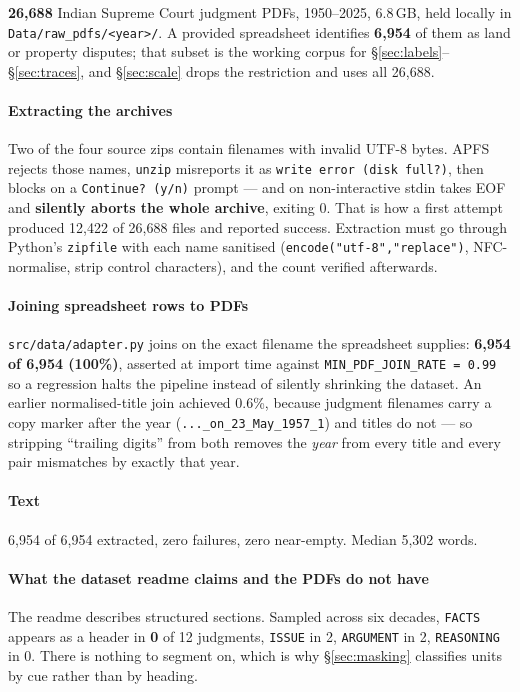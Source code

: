 \documentclass[12pt,a4paper]{article}
\newcommand{\code}[1]{\texttt{\small #1}}
\begin{document}
\textbf{26,688} Indian Supreme Court judgment PDFs, 1950--2025, 6.8\,GB, held locally in
\code{Data/raw\_pdfs/<year>/}. A provided spreadsheet identifies \textbf{6,954} of them as land or
property disputes; that subset is the working corpus for §\ref{sec:labels}--§\ref{sec:traces}, and
§\ref{sec:scale} drops the restriction and uses all 26,688.

\paragraph{Extracting the archives} Two of the four source zips contain filenames with invalid
UTF-8 bytes. APFS rejects those names, \code{unzip} misreports it as \code{write error (disk
full?)}, then blocks on a \code{Continue? (y/n)} prompt --- and on non-interactive stdin takes EOF
and \textbf{silently aborts the whole archive}, exiting 0. That is how a first attempt produced
12,422 of 26,688 files and reported success. Extraction must go through Python's \code{zipfile} with
each name sanitised (\code{encode("utf-8","replace")}, NFC-normalise, strip control characters), and
the count verified afterwards.

\paragraph{Joining spreadsheet rows to PDFs} \code{src/data/adapter.py} joins on the exact filename
the spreadsheet supplies: \textbf{6,954 of 6,954 (100\%)}, asserted at import time against
\code{MIN\_PDF\_JOIN\_RATE = 0.99} so a regression halts the pipeline instead of silently shrinking
the dataset. An earlier normalised-title join achieved 0.6\%, because judgment filenames carry a
copy marker after the year (\code{...\_on\_23\_May\_1957\_1}) and titles do not --- so stripping
``trailing digits'' from both removes the \emph{year} from every title and every pair mismatches by
exactly that year.

\paragraph{Text} 6,954 of 6,954 extracted, zero failures, zero near-empty. Median 5,302 words.

\paragraph{What the dataset readme claims and the PDFs do not have} The readme describes structured
sections. Sampled across six decades, \code{FACTS} appears as a header in \textbf{0} of 12
judgments, \code{ISSUE} in 2, \code{ARGUMENT} in 2, \code{REASONING} in 0. There is nothing to
segment on, which is why §\ref{sec:masking} classifies units by cue rather than by heading.
\end{document}
